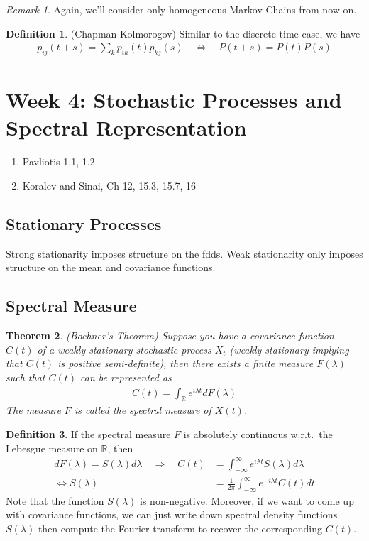 \documentclass[12pt]{article}
\theoremstyle{plain}
\newtheorem{thm}{Theorem}[section]
\theoremstyle{definition}
\newtheorem{defn}[thm]{Definition}
\theoremstyle{remark}
\newtheorem*{rmk}{Remark}
\begin{document}
\begin{rmk}
Again, we'll consider only homogeneous Markov Chains from now on.
\end{rmk}

\begin{defn}{(Chapman-Kolmorogov)}
Similar to the discrete-time case, we have
\begin{align*}
  p_{ij}(t+s) = \sum_k p_{ik}(t) p_{kj}(s)
  \quad \Leftrightarrow \quad
  P(t+s) = P(t)P(s)
\end{align*}
\end{defn}

\section{Week 4: Stochastic Processes and Spectral Representation}

\begin{enumerate}
  \item Pavliotis 1.1, 1.2
  \item Koralev and Sinai, Ch 12, 15.3, 15.7, 16
\end{enumerate}

\subsection{Stationary Processes}

Strong stationarity imposes structure on the fdds. Weak stationarity
only imposes structure on the mean and covariance functions.

\subsection{Spectral Measure}

\begin{thm}\emph{(Bochner's Theorem)}
Suppose you have a covariance function $C(t)$ of a weakly stationary
stochastic process $X_t$ (weakly stationary implying that $C(t)$ is
positive semi-definite), then there exists a finite measure $F(\lambda)$
such that $C(t)$ can be represented as
\begin{align*}
  C(t) = \int_\mathbb{R} e^{i\lambda t} dF(\lambda)
\end{align*}
The measure $F$ is called the \emph{spectral measure} of $X(t)$.
\end{thm}

\begin{defn}
If the spectral measure $F$ is absolutely continuous w.r.t.\ the
Lebesgue measure on $\mathbb{R}$, then
\begin{align*}
  dF(\lambda) = S(\lambda)d\lambda
  \quad \Rightarrow\quad
  C(t)
    &= \int^\infty_{-\infty} e^{i\lambda t} S(\lambda) d\lambda \\
  \Leftrightarrow
  S(\lambda)
    &= \frac{1}{2\pi} \int^\infty_{-\infty} e^{-i\lambda t} C(t) dt
\end{align*}
Note that the function $S(\lambda)$ is non-negative. Moreover, if we
want to come up with covariance functions, we can just write down
spectral density functions $S(\lambda)$ then compute the Fourier
transform to recover the corresponding $C(t)$.
\end{defn}
\end{document}
